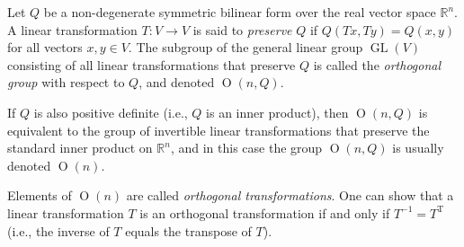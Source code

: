\documentclass{article}
\begin{document}
Let $Q$ be a non-degenerate symmetric bilinear form over the real vector space $\mathbb{R}^n$. A linear transformation $T\colon V \to V$ is said to \emph{preserve} $Q$ if $Q(Tx,Ty) = Q(x,y)$ for all vectors $x,y \in V$. The subgroup of the general linear group $\operatorname{GL}(V)$ consisting of all linear transformations that preserve $Q$ is called the \emph{orthogonal group} with respect to $Q$, and denoted  $\operatorname{O}(n,Q)$.

If $Q$ is also positive definite (i.e., $Q$ is an inner product), then $\operatorname{O}(n,Q)$ is equivalent to the group of invertible linear transformations that preserve the standard inner product on $\mathbb{R}^n$, and in this case the group $\operatorname{O}(n,Q)$ is usually denoted $\operatorname{O}(n)$.

Elements of $\operatorname{O}(n)$ are called \emph{orthogonal transformations}. 
One can show that a linear transformation $T$ is an orthogonal transformation if and only if $T^{-1} = T^{\operatorname{T}}$ (i.e., the inverse of $T$ equals the transpose of $T$).
\end{document}
